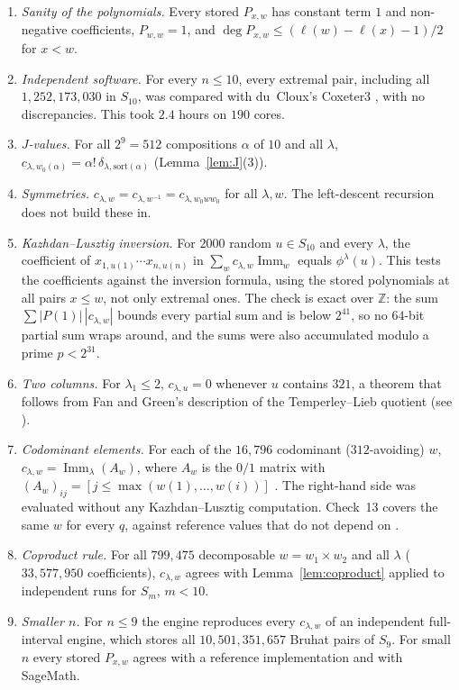 \documentclass[11pt]{amsart}
\theoremstyle{definition}
\theoremstyle{remark}
\newcommand{\Z}{\mathbb{Z}}
\newcommand{\Imm}{\operatorname{Imm}}
\begin{document}
\begin{enumerate}
\item \emph{Sanity of the polynomials.} Every stored $P_{x,w}$ has constant term $1$ and non-negative coefficients, $P_{w,w}=1$, and $\deg P_{x,w}\le(\ell(w)-\ell(x)-1)/2$ for $x<w$.
\item \emph{Independent software.} For every $n\le 10$, every extremal pair, including all $1{,}252{,}173{,}030$ in $S_{10}$, was compared with du~Cloux's \textsf{Coxeter3} \cite{Cox3}, with no discrepancies. This took $2.4$ hours on $190$ cores.
\item \emph{$J$-values.} For all $2^9=512$ compositions $\alpha$ of $10$ and all $\lambda$, $c_{\lambda,w_0(\alpha)}=\alpha!\,\delta_{\lambda,\mathrm{sort}(\alpha)}$ (Lemma~\ref{lem:J}(3)).
\item \emph{Symmetries.} $c_{\lambda,w}=c_{\lambda,w^{-1}}=c_{\lambda,w_0ww_0}$ for all $\lambda,w$. The left-descent recursion does not build these in.
\item \emph{Kazhdan--Lusztig inversion.} For $2000$ random $u\in S_{10}$ and every $\lambda$, the coefficient of $x_{1,u(1)}\cdots x_{n,u(n)}$ in $\sum_wc_{\lambda,w}\Imm_w$ equals $\phi^\lambda(u)$. This tests the coefficients against the inversion formula, using the stored polynomials at all pairs $x\le w$, not only extremal ones. The check is exact over $\Z$: the sum $\sum|P(1)|\,|c_{\lambda,w}|$ bounds every partial sum and is below $2^{41}$, so no $64$-bit partial sum wraps around, and the sums were also accumulated modulo a prime $p<2^{31}$.
\item \emph{Two columns.} For $\lambda_1\le2$, $c_{\lambda,u}=0$ whenever $u$ contains $321$, a theorem that follows from Fan and Green's description of the Temperley--Lieb quotient \cite{FG} (see \cite[Lemma~8.1]{McN}).
\item \emph{Codominant elements.} For each of the $16{,}796$ codominant ($312$-avoiding) $w$, $c_{\lambda,w}=\Imm_\lambda(A_w)$, where $A_w$ is the $0/1$ matrix with $(A_w)_{ij}=[j\le\max(w(1),\dots,w(i))]$ \cite[Prop.~7.1]{McN}. The right-hand side was evaluated without any Kazhdan--Lusztig computation. Check~13 covers the same $w$ for every $q$, against reference values that do not depend on \cite{McN}.
\item \emph{Coproduct rule.} For all $799{,}475$ decomposable $w=w_1\times w_2$ and all $\lambda$ ($33{,}577{,}950$ coefficients), $c_{\lambda,w}$ agrees with Lemma~\ref{lem:coproduct} applied to independent runs for $S_m$, $m<10$.
\item \emph{Smaller $n$.} For $n\le9$ the engine reproduces every $c_{\lambda,w}$ of an independent full-interval engine, which stores all $10{,}501{,}351{,}657$ Bruhat pairs of $S_9$. For small $n$ every stored $P_{x,w}$ agrees with a reference implementation and with SageMath.

\end{enumerate}
\end{document}
